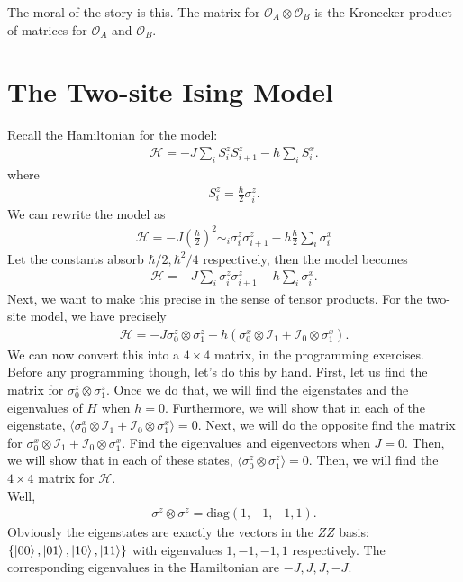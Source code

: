 \documentclass{book}
\theoremstyle{definition}
\newcommand{\had}{\mathcal{H}}
\newcommand{\f}[2]{\frac{#1}{#2}}
\newcommand{\lp}{\left(}
\newcommand{\rp}{\right)}
\newcommand{\Id}{\mathcal{I}}
\begin{document}
The moral of the story is this. The matrix for $\mathcal{O}_A \otimes \mathcal{O}_B$ is the Kronecker product of matrices for $\mathcal{O}_A$ and $\mathcal{O}_B$. 




\section{The Two-site Ising Model}

Recall the Hamiltonian for the model:
\begin{align}
\had = -J \sum_i S_i^z S_{i+1}^z - h \sum_i S_i^x.
\end{align}
where
\begin{align}
S_i^z = \f{\hbar}{2}\sigma_i^z.
\end{align}
We can rewrite the model as
\begin{align}
\had = -J \lp \f{\hbar}{2} \rp^2 \sim_i \sigma_i^z \sigma_{i+1}^z - h \f{\hbar}{2}\sum_i \sigma^x_i
\end{align}
Let the constants absorb $\hbar/2, \hbar^2/4$ respectively, then the model becomes
\begin{align}
\had = -J \sum_i \sigma_i^z\sigma_{i+1}^z - h\sum_i \sigma_i^x.
\end{align}
Next, we want to make this precise in the sense of tensor products. For the two-site model, we have precisely
\begin{align}
\had = -J \sigma_0^z \otimes \sigma_1^z - h (\sigma_0^x \otimes \Id_1 + \Id_0\otimes\sigma_1^x).
\end{align} 
We can now convert this into a $4\times 4$ matrix, in the programming exercises. \\

Before any programming though, let's do this by hand. First, let us find the matrix for $\sigma_0^z \otimes \sigma_1^z$. Once we do that, we will find the eigenstates and the eigenvalues of $H$ when $h=0$. Furthermore, we will show that in each of the eigenstate, $\langle \sigma_0^x\otimes \Id_1 + \Id_0 \otimes \sigma_1^x \rangle = 0$. Next, we will do the opposite find the matrix for $\sigma_0^x\otimes \Id_1 + \Id_0 \otimes \sigma_1^x$. Find the eigenvalues and eigenvectors when $J =0$. Then, we will show that in each of these states, $\langle \sigma_0^z \otimes \sigma_1^z \rangle = 0$. Then, we will find the $4\times 4$ matrix for $\had$. \\

Well,
\begin{align}
\sigma^z \otimes \sigma^z = \text{diag}(1,-1,-1,1).
\end{align} 
Obviously the eigenstates are exactly the vectors in the $ZZ$ basis: $\{ \ket{00}, \ket{01}, \ket{10}, \ket{11}\}$ with eigenvalues $1,-1,-1,1$ respectively. The corresponding eigenvalues in the Hamiltonian are $-J,J,J,-J$. \\
\end{document}

